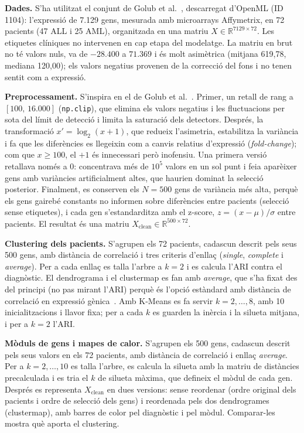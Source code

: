 \documentclass[11pt,a4paper]{article}
\begin{document}
\textbf{Dades.} S'ha utilitzat el conjunt de Golub et al.~\cite{golub}, descarregat d'OpenML (ID 1104): l'expressió de 7.129 gens, mesurada amb microarrays Affymetrix, en 72 pacients (47 ALL i 25 AML), organitzada en una matriu $X\in\mathbb{R}^{7129\times 72}$. Les etiquetes clíniques no intervenen en cap etapa del modelatge. La matriu en brut no té valors nuls, va de $-28.400$ a $71.369$ i és molt asimètrica (mitjana 619,78, mediana 120,00); els valors negatius provenen de la correcció del fons i no tenen sentit com a expressió.

\textbf{Preprocessament.} S'inspira en el de Golub et al.~\cite{golub}. Primer, un retall de rang a $[100,\,16.000]$ (\texttt{np.clip}), que elimina els valors negatius i les fluctuacions per sota del límit de detecció i limita la saturació dels detectors. Després, la transformació $x'=\log_2(x+1)$, que redueix l'asimetria, estabilitza la variància i fa que les diferències es llegeixin com a canvis relatius d'expressió (\emph{fold-change}); com que $x\ge100$, el $+1$ és innecessari però inofensiu. Una primera versió retallava només a 0: concentrava més de $10^5$ valors en un sol punt i feia aparèixer gens amb variàncies artificialment altes, que haurien dominat la selecció posterior. Finalment, es conserven els $N=500$ gens de variància més alta, perquè els gens gairebé constants no informen sobre diferències entre pacients (selecció sense etiquetes), i cada gen s'estandarditza amb el z-score, $z=(x-\mu)/\sigma$ entre pacients. El resultat és una matriu $X_{\text{clean}}\in\mathbb{R}^{500\times72}$.

\textbf{Clustering dels pacients.} S'agrupen els 72 pacients, cadascun descrit pels seus 500 gens, amb distància de correlació i tres criteris d'enllaç (\emph{single}, \emph{complete} i \emph{average}). Per a cada enllaç es talla l'arbre a $k=2$ i es calcula l'ARI contra el diagnòstic. El dendrograma i el clustermap es fan amb \emph{average}, que s'ha fixat des del principi (no pas mirant l'ARI) perquè és l'opció estàndard amb distància de correlació en expressió gènica~\cite{eisen}. Amb K-Means es fa servir $k=2,\dots,8$, amb 10 inicialitzacions i llavor fixa; per a cada $k$ es guarden la inèrcia i la silueta mitjana, i per a $k=2$ l'ARI.

\textbf{Mòduls de gens i mapes de calor.} S'agrupen els 500 gens, cadascun descrit pels seus valors en els 72 pacients, amb distància de correlació i enllaç \emph{average}. Per a $k=2,\dots,10$ es talla l'arbre, es calcula la silueta amb la matriu de distàncies precalculada i es tria el $k$ de silueta màxima, que defineix el mòdul de cada gen. Després es representa $X_{\text{clean}}$ en dues versions: sense reordenar (ordre original dels pacients i ordre de selecció dels gens) i reordenada pels dos dendrogrames (clustermap), amb barres de color pel diagnòstic i pel mòdul. Comparar-les mostra què aporta el clustering.
\end{document}
